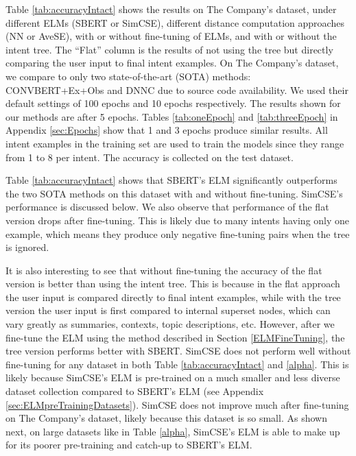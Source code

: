\documentclass[sigconf, anonymous=true]{acmart}
\begin{document}
Table \ref{tab:accuracyIntact} shows the results on The Company's dataset, under different ELMs (SBERT or SimCSE), different distance computation approaches (NN or AveSE), with or without fine-tuning of ELMs, and with or without the intent tree. The “Flat” column is the results of not using the tree but directly comparing the user input to final intent examples. On The Company's dataset, we compare to only two state-of-the-art (SOTA) methods: CONVBERT+Ex+Obs \citep{mehri-eric-2021-example} and DNNC \citep{zhang-etal-2020-discriminative} due to source code availability. We used their default settings of 100 epochs and 10 epochs respectively. The results shown for our methods are after 5 epochs. Tables \ref{tab:oneEpoch} and \ref{tab:threeEpoch} in Appendix \ref{sec:Epochs} show that 1 and 3 epochs produce similar results. All intent examples in the training set are used to train the models since they range from 1 to 8 per intent. The accuracy is collected on the test dataset.  

Table \ref{tab:accuracyIntact} shows that SBERT's ELM significantly outperforms the two SOTA methods on this dataset with and without fine-tuning. SimCSE's performance is discussed below. We also observe that performance of the flat version drops after fine-tuning. This is likely due to many intents having only one example, which means they produce only negative fine-tuning pairs when the tree is ignored. 

It is also interesting to see that without fine-tuning the accuracy of the flat version is better than using the intent tree. This is because in the flat approach the user input is compared directly to final intent examples, while with the tree version the user input is first compared to internal superset nodes, which can vary greatly as summaries, contexts, topic descriptions, etc. However, after we fine-tune the ELM using the method described in Section \ref{ELMFineTuning}, the tree version performs better with SBERT. SimCSE does not perform well without fine-tuning for any dataset in both Table \ref{tab:accuracyIntact} and \ref{alpha}. This is likely because SimCSE's ELM is pre-trained on a much smaller and less diverse dataset collection compared to SBERT's ELM (see Appendix \ref{sec:ELMpreTrainingDatasets}). SimCSE does not improve much after fine-tuning on The Company's dataset, likely because this dataset is so small. As shown next, on large datasets like in Table \ref{alpha}, SimCSE's ELM is able to make up for its poorer pre-training and catch-up to SBERT's ELM.   
\end{document}
